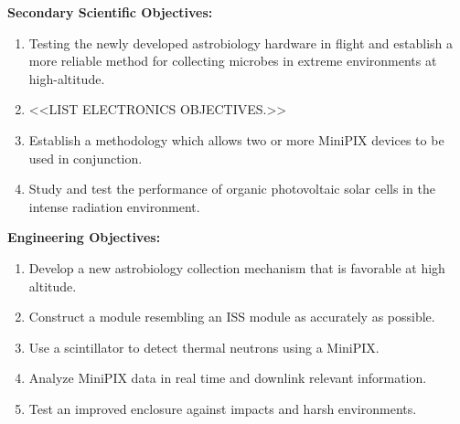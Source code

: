 \noindent \textbf {Secondary Scientific Objectives:}
\begin{enumerate}
\item Testing the newly developed astrobiology hardware in flight and establish a more reliable method for collecting microbes in extreme environments at high-altitude.
\item <<LIST ELECTRONICS OBJECTIVES.>>
\item Establish a methodology which allows two or more MiniPIX devices to be used in conjunction.
\item Study and test the performance of organic photovoltaic solar cells in the intense radiation environment.
\end{enumerate}

\noindent \textbf {Engineering Objectives:}
\begin{enumerate}
\item Develop a new astrobiology collection mechanism that is favorable at high altitude.
\item Construct a module resembling an ISS module as accurately as possible.
\item Use a scintillator to detect thermal neutrons using a MiniPIX.
\item Analyze MiniPIX data in real time and downlink relevant information.
\item Test an improved enclosure against impacts and harsh environments.
\end{enumerate}



